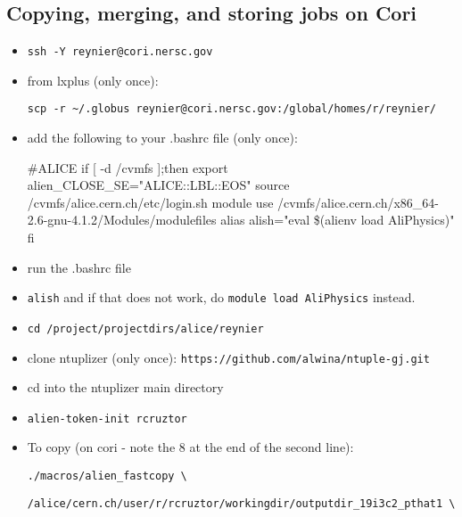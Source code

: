 \documentclass[12pt]{article}
\begin{document}
\subsection{Copying, merging, and storing jobs on Cori}

\begin{itemize}
\item \verb|ssh -Y reynier@cori.nersc.gov|

\color{red}
\item from lxplus (only once):

\verb|scp -r ~/.globus reynier@cori.nersc.gov:/global/homes/r/reynier/|

\item add the following to your .bashrc file (only once):

\begin{tcolorbox}
\begin{verbnobox}[\scriptsize]
#ALICE
if [ -d /cvmfs ];then
        export alien_CLOSE_SE="ALICE::LBL::EOS"
        source /cvmfs/alice.cern.ch/etc/login.sh
        module use /cvmfs/alice.cern.ch/x86_64-2.6-gnu-4.1.2/Modules/modulefiles
        alias alish="eval \$(alienv load AliPhysics)"
fi
\end{verbnobox}  
\end{tcolorbox}

\color{black}

\item run the .bashrc file

\item \verb|alish| and if that does not work, do \verb|module load AliPhysics| instead.

\item \verb|cd /project/projectdirs/alice/reynier|

\color{red}
\item clone ntuplizer (only once): \verb|https://github.com/alwina/ntuple-gj.git|
\color{black}

\item cd into the ntuplizer main directory

\item \verb|alien-token-init rcruztor|

\item To copy (on cori - note the 8 at the end of the second line):

\verb|./macros/alien_fastcopy \|

\verb|/alice/cern.ch/user/r/rcruztor/workingdir/outputdir_19i3c2_pthat1 \|


\end{itemize}
\end{document}
